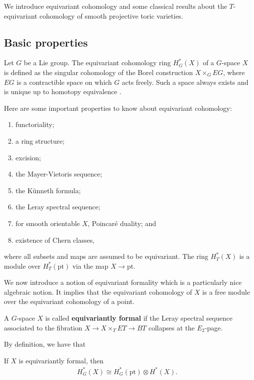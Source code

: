 We introduce equivariant cohomology and some classical results about the
$T$-equivariant cohomology of smooth projective toric varieties.

\subsection{Basic properties}
Let $G$ be a Lie group. The equivariant cohomology ring $H_G^*(X)$ of a $G$-space $X$ is
defined as the singular cohomology of the Borel construction $X\times_G EG$,
where $EG$ is a contractible space on which $G$ acts freely. Such a space
always exists and is unique up to homotopy equivalence \cite{hatcher}.

\hfill

Here are some important properties to know about equivariant cohomology:

\begin{enumerate}
	\item functoriality;
	\item a ring structure;
	\item excision;
	\item the Mayer-Vietoris sequence;
	\item the Künneth formula;
	\item the Leray spectral sequence;
	\item for smooth orientable $X$, Poincaré duality; and
	\item existence of Chern classes,
\end{enumerate}
where all subsets and maps are assumed to be equivariant. The
ring $H^*_T(X)$ is a module over $H^*_T(\text{pt})$ via the map $X \to \text{pt}$.

\hfill

We now introduce a notion of equivariant formality which is a particularly
nice algebraic notion.
It implies that
the equivariant cohomology of $X$ is a free module over the equivariant cohomology
of a point.

\begin{definition}
	A $G$-space $X$ is called \textbf{equivariantly formal} if the Leray spectral sequence
	associated to the fibration $X \to X \times_T ET \to BT$ collapses at the $E_2$-page.
\end{definition}

By definition, we have that
\begin{proposition}
	If $X$ is equivariantly formal, then \begin{align*}
		H^*_G(X) \cong H^*_G(\text{pt}) \otimes H^*(X).
	\end{align*}
\end{proposition}

